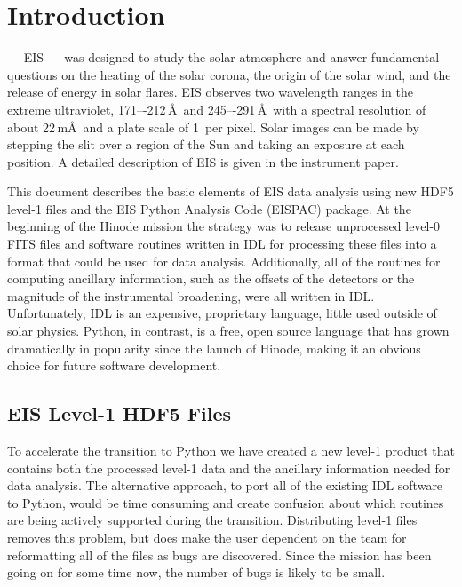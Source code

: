 
\chapter{Introduction}

 --- EIS --- was designed to study the solar atmosphere and
answer fundamental questions on the heating of the solar corona, the origin of the solar wind, and the
release of energy in solar flares. EIS observes two wavelength ranges in the extreme ultraviolet,
171–-212\,\AA\ and 245–-291\,\AA\ with a spectral resolution of about 22\,m\AA\ and a plate scale
of 1\arcsec\ per pixel. Solar images can be made by stepping the slit over a region of the Sun and
taking an exposure at each position. A detailed description of EIS is given in the instrument
paper\cite{Culhane:2007}.

This document describes the basic elements of EIS data analysis using new HDF5 level-1 files and
the EIS Python Analysis Code (EISPAC) package. At the beginning of the Hinode mission the
strategy was to release unprocessed level-0 FITS files and software routines written in IDL for
processing these files into a format that could be used for data analysis. Additionally, all of
the routines for computing ancillary information, such as the offsets of the detectors or the magnitude
of the instrumental broadening, were all written in IDL. Unfortunately, IDL is an expensive,
proprietary language, little used outside of solar physics. Python, in contrast, is a free, open
source language that has grown dramatically in popularity since the launch of Hinode, making it an
obvious choice for future software development.

\section{EIS Level-1 HDF5 Files}
To accelerate the transition to Python we have created a new level-1 product that contains both the
processed level-1 data and the ancillary information needed for data analysis. The alternative
approach, to port all of the existing IDL software to Python, would be time consuming and create
confusion about which routines are being actively supported during the transition. Distributing
level-1 files removes this problem, but does make the user dependent on the team for reformatting
all of the files as bugs are discovered. Since the mission has been going on for some time now, the
number of bugs is likely to be small.


